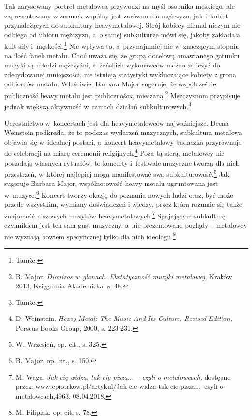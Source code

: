 \documentclass[12pt, a4paper, titlepage]{report}
\begin{document}
Tak zarysowany portret metalowca przywodzi na myśl osobnika męskiego,  ale zaprezentowany wizerunek wspólny jest zarówno dla mężczyzn, jak i~kobiet przynależących do subkultury heavymetalowej. Strój kobiecy niemal niczym nie odbiega od ubioru mężczyzn, a~o samej subkulturze mówi się, jakoby zakładała kult siły i~męskości.\footnote{Tamże.} Nie wpływa to, a~przynajmniej nie w~znaczącym stopniu na ilość fanek metalu. Choć uważa się, że grupą docelową omawianego gatunku muzyki są młodzi mężczyźni, a~żeńskich wykonawców można zaliczyć do zdecydowanej mniejszości, nie istnieją statystyki wykluczające kobiety z grona odbiorców metalu. Właściwie, Barbara Major sugeruje, że współcześnie publiczność heavy metalu jest publicznością mieszaną.\footnote{B. Major, \textit{Dionizos w~glanach. Ekstatyczność muzyki metalowej,} Kraków 2013, Księgarnia Akademicka, s. 48.} Mężczyznom przypisuje jednak większą aktywność w~ramach działań subkulturowych.\footnote{Tamże.}


Uczestnictwo w~koncertach jest dla heavymetalowców najważniejsze. Deena Weinstein podkreśla, że to podczas wydarzeń muzycznych, subkultura metalowa objawia się w~idealnej postaci, a~koncert heavymetalowy badaczka przyrównuje do celebracji na miarę ceremonii religijnych.\footnote{D. Weinstein, \textit{Heavy Metal: The Music And Its Culture, Revised Edition}, Perseus Books Group, 2000, s. 223-231.} Poza tą sferą, metalowcy nie posiadają własnych rytuałów; to koncerty i~festiwale muzyczne tworzą dla nich przestrzeń, w~której najlepiej mogą manifestować swą subkulturowość.\footnote{W. Wrzesień, op. cit., s. 325.} Jak sugeruje Barbara Major, wspólnotowość heavy metalu ugruntowana jest w~muzyce.\footnote{B. Major, op. cit., s. 150.} Koncert tworzy okazję do poznania nowych ludzi oraz, być może przede wszystkim, wymiany doświadczeń i wiedzy, przez którą rozumie się także znajomość niszowych muzyków heavymetalowych.\footnote{M. Waga, \textit{Jak cię widzą, tak cię piszą... -- czyli o metalowcach,} dostępne przez: www.epiotrkow.pl/\break artykul/Jak-cie-widza-tak-cie-pisza...--czyli-o-metalowcach,4963, 08.04.2018.} Spajającym subkulturę czynnikiem jest ten sam gust muzyczny, a~nie prezentowane poglądy -- metalowcy nie wyznają bowiem specyficznej tylko dla nich ideologii.\footnote{M. Filipiak, op. cit, s. 78.}
\end{document}
